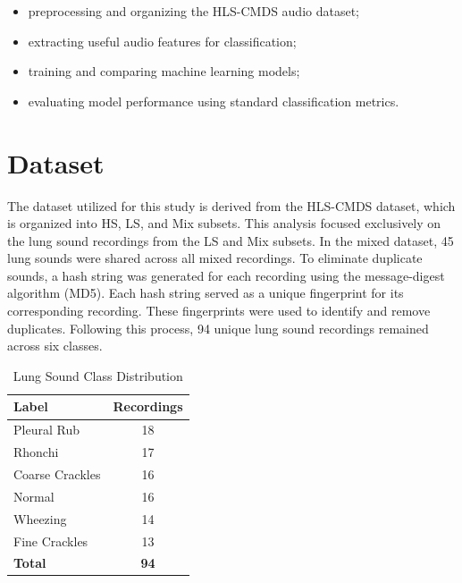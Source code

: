 \documentclass[conference]{IEEEtran}
\begin{document}
\begin{itemize}
    \item preprocessing and organizing the HLS-CMDS audio dataset;
    \item extracting useful audio features for classification;
    \item training and comparing machine learning models;
    \item evaluating model performance using standard classification metrics.
\end{itemize}

\section{Dataset}
The dataset utilized for this study is derived from the HLS-CMDS dataset, which is organized into HS, LS, and Mix subsets. This analysis focused exclusively on the lung sound recordings from the LS and Mix subsets. In the mixed dataset, 45 lung sounds were shared across all mixed recordings. To eliminate duplicate sounds, a hash string was generated for each recording using the message-digest algorithm (MD5). Each hash string served as a unique fingerprint for its corresponding recording. These fingerprints were used to identify and remove duplicates. Following this process, 94 unique lung sound recordings remained across six classes.

\begin{table}[htbp]
\caption{Lung Sound Class Distribution}
\begin{center}
\begin{tabular}{lc}
\hline
\textbf{Label} & \textbf{Recordings} \\
\hline
Pleural Rub & 18 \\
Rhonchi & 17 \\
Coarse Crackles & 16 \\
Normal & 16 \\
Wheezing & 14 \\
Fine Crackles & 13 \\
\hline
\textbf{Total} & \textbf{94} \\
\hline
\end{tabular}
\label{tab:dataset-summary}
\end{center}
\end{table}
\end{document}
